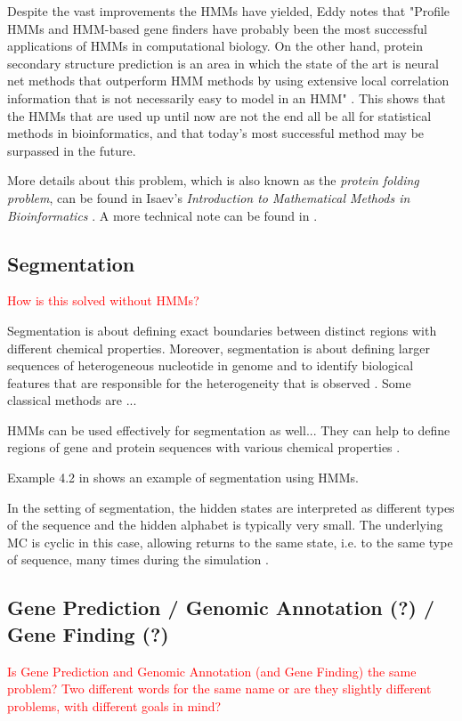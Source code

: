 \documentclass{article}\usepackage[]{graphicx}\usepackage[]{color}
\begin{document}
Despite the vast improvements the HMMs have yielded, Eddy notes that "Profile HMMs and HMM-based gene finders have probably been the most successful applications of HMMs in computational biology. On the other hand, protein secondary structure prediction is an area in which the state of the art is neural net methods that outperform HMM methods by using extensive local correlation information that is not necessarily easy to model in an HMM" \cite{Eddy1998}. This shows that the HMMs that are used up until now are not the end all be all for statistical methods in bioinformatics, and that today's most successful method may be surpassed in the future. 

More details about this problem, which is also known as the \textit{protein folding problem}, can be found in Isaev's \textit{Introduction to Mathematical Methods in Bioinformatics} \cite{Isaev2006}. A more technical note can be found in \cite{Choo2004}.

\subsection{Segmentation}

\textcolor{red}{How is this solved without HMMs?}

Segmentation is about defining exact boundaries between distinct regions with different chemical properties. Moreover, segmentation is about defining larger sequences of heterogeneous nucleotide in genome and to identify biological features that are responsible for the heterogeneity that is observed \cite{Christianini2006}. Some classical methods are ...

HMMs can be used effectively for segmentation as well... They can help to define regions of gene and protein sequences with various chemical properties \cite{Christianini2006}. 

Example 4.2 in \cite{Christianini2006} shows an example of segmentation using HMMs.

In the setting of segmentation, the hidden states are interpreted as different types of the sequence and the hidden alphabet is typically very small. The underlying MC is cyclic in this case, allowing returns to the same state, i.e. to the same type of sequence, many times during the simulation \cite{Christianini2006}. 

\subsection{Gene Prediction / Genomic Annotation (?) / Gene Finding (?)}
\textcolor{red}{Is Gene Prediction and Genomic Annotation (and Gene Finding) the same problem? Two different words for the same name or are they slightly different problems, with different goals in mind?}
\end{document}
